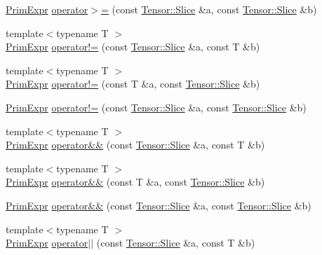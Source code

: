 \begin{DoxyCompactItemize}
\item 
\hyperlink{classtvm_1_1PrimExpr}{Prim\+Expr} \hyperlink{namespacetvm_1_1te_ac3fd738e5127c9070b347732f40c88b9}{operator$>$=} (const \hyperlink{classtvm_1_1te_1_1Tensor_1_1Slice}{Tensor\+::\+Slice} \&a, const \hyperlink{classtvm_1_1te_1_1Tensor_1_1Slice}{Tensor\+::\+Slice} \&b)
\item 
{\footnotesize template$<$typename T $>$ }\\\hyperlink{classtvm_1_1PrimExpr}{Prim\+Expr} \hyperlink{namespacetvm_1_1te_a8953e862224184536c2a94d773abf62d}{operator!=} (const \hyperlink{classtvm_1_1te_1_1Tensor_1_1Slice}{Tensor\+::\+Slice} \&a, const T \&b)
\item 
{\footnotesize template$<$typename T $>$ }\\\hyperlink{classtvm_1_1PrimExpr}{Prim\+Expr} \hyperlink{namespacetvm_1_1te_a9aa8f8b632906748d97cf155d9c41449}{operator!=} (const T \&a, const \hyperlink{classtvm_1_1te_1_1Tensor_1_1Slice}{Tensor\+::\+Slice} \&b)
\item 
\hyperlink{classtvm_1_1PrimExpr}{Prim\+Expr} \hyperlink{namespacetvm_1_1te_a2ec6eaac719b6db0b90cb3bc2111c627}{operator!=} (const \hyperlink{classtvm_1_1te_1_1Tensor_1_1Slice}{Tensor\+::\+Slice} \&a, const \hyperlink{classtvm_1_1te_1_1Tensor_1_1Slice}{Tensor\+::\+Slice} \&b)
\item 
{\footnotesize template$<$typename T $>$ }\\\hyperlink{classtvm_1_1PrimExpr}{Prim\+Expr} \hyperlink{namespacetvm_1_1te_a1c953ed8d8af876442f158bc97c7478a}{operator\&\&} (const \hyperlink{classtvm_1_1te_1_1Tensor_1_1Slice}{Tensor\+::\+Slice} \&a, const T \&b)
\item 
{\footnotesize template$<$typename T $>$ }\\\hyperlink{classtvm_1_1PrimExpr}{Prim\+Expr} \hyperlink{namespacetvm_1_1te_af5599e3e5add2bfba06085275213de11}{operator\&\&} (const T \&a, const \hyperlink{classtvm_1_1te_1_1Tensor_1_1Slice}{Tensor\+::\+Slice} \&b)
\item 
\hyperlink{classtvm_1_1PrimExpr}{Prim\+Expr} \hyperlink{namespacetvm_1_1te_a5e13828dac02bc1cb4e63e08a9b2eeba}{operator\&\&} (const \hyperlink{classtvm_1_1te_1_1Tensor_1_1Slice}{Tensor\+::\+Slice} \&a, const \hyperlink{classtvm_1_1te_1_1Tensor_1_1Slice}{Tensor\+::\+Slice} \&b)
\item 
{\footnotesize template$<$typename T $>$ }\\\hyperlink{classtvm_1_1PrimExpr}{Prim\+Expr} \hyperlink{namespacetvm_1_1te_a1fd6b8f8380a489cfcd806952c2aae42}{operator$\vert$$\vert$} (const \hyperlink{classtvm_1_1te_1_1Tensor_1_1Slice}{Tensor\+::\+Slice} \&a, const T \&b)

\end{DoxyCompactItemize}

